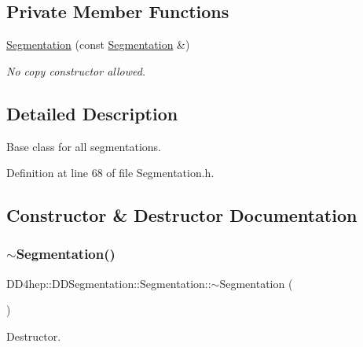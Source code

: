 \subsection*{Private Member Functions}
\begin{DoxyCompactItemize}
\item 
\hyperlink{class_d_d4hep_1_1_d_d_segmentation_1_1_segmentation_aba1d0cb4ca5528c499ecde5f6000ae01}{Segmentation} (const \hyperlink{class_d_d4hep_1_1_d_d_segmentation_1_1_segmentation}{Segmentation} \&)
\begin{DoxyCompactList}\small\item\em No copy constructor allowed. \end{DoxyCompactList}\end{DoxyCompactItemize}


\subsection{Detailed Description}
Base class for all segmentations. 

Definition at line 68 of file Segmentation.\+h.



\subsection{Constructor \& Destructor Documentation}
\hypertarget{class_d_d4hep_1_1_d_d_segmentation_1_1_segmentation_a2865f0e68cb2ecfb5717584e67be4228}{}\label{class_d_d4hep_1_1_d_d_segmentation_1_1_segmentation_a2865f0e68cb2ecfb5717584e67be4228} 
\subsubsection{\texorpdfstring{$\sim$\+Segmentation()}{~Segmentation()}}
{\footnotesize\ttfamily D\+D4hep\+::\+D\+D\+Segmentation\+::\+Segmentation\+::$\sim$\+Segmentation (\begin{DoxyParamCaption}{ }\end{DoxyParamCaption})\hspace{0.3cm}{\ttfamily [virtual]}}



Destructor. 



